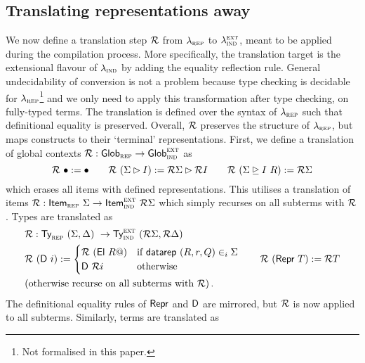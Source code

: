 \subsection{Translating representations away}

We now define a translation step $\mathcal{R}$ from $\lambda_{\textsc{rep}}$ to
$\lambda_{\textsc{ind}}^{\textsc{ext}}$, meant to be applied during the compilation process.
More specifically, the translation target is the extensional flavour of
$\lambda_{\textsc{ind}}$ by adding the equality reflection rule. General undecidability of
conversion is not a problem because type checking is decidable for
$\lambda_{\textsc{rep}}$\footnote{Not formalised in this paper.} and we only need to apply this
transformation after type checking, on fully-typed terms. The translation is
defined over the syntax of $\lambda_{\textsc{rep}}$ \cite{Boulier2017-cm} such that
definitional equality is preserved. Overall, $\mathcal{R}$ preserves the structure of
$\lambda_{\textsc{rep}}$, but maps constructs to their `terminal' representations.
First, we define a translation of global contexts $\mathcal{R} : \textsf{Glob}_{\textsc{rep}} \to \textsf{Glob}_{\textsc{ind}}^\textsc{ext}$ as
\[
\mathcal{R}\ \bullet := \bullet \qquad \mathcal{R}\ (\Sigma \rhd I) := \mathcal{R} \Sigma \rhd \mathcal{R} I \qquad \mathcal{R}\ (\Sigma \unrhd I \ R) := \mathcal{R} \Sigma
\]
which erases all items with defined representations.
This utilises a translation of items $\mathcal{R} : \textsf{Item}_{\textsc{rep}}\ \Sigma \to \textsf{Item}_{\textsc{ind}}^\textsc{ext}\ \mathcal{R}
\Sigma$ which simply recurses on all subterms with $\mathcal{R}$.
Types are translated as
\begin{align*}
  & \mathcal{R} : \textsf{Ty}_{\textsc{rep}}\ (\Sigma, \Delta)\ \to \textsf{Ty}_{\textsc{ind}}^\textsc{ext}\ (\mathcal{R} \Sigma, \mathcal{R} \Delta) \\
  & \mathcal{R}\ (\textsf{D}\ i) := \begin{cases}
  \mathcal{R}\ (\textsf{El}\ R@) & \text{if $\textsf{datarep}\ (R, r, Q) \in_i \Sigma$} \\
  \textsf{D}\ \mathcal{R} i & \text{otherwise}
  \end{cases}  \qquad \mathcal{R}\ (\textsf{Repr}\ T) := \mathcal{R} T \\
  & \text{(otherwise recurse on all subterms with $\mathcal{R}$)} \,.
\end{align*}
The definitional equality rules of $\textsf{Repr}$ and $\textsf{D}$ are mirrored, but $\mathcal{R}$ is now applied
to all subterms.
Similarly, terms are translated as
